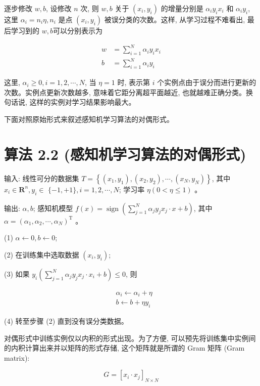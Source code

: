 \documentclass[10pt]{article}
\begin{document}
逐步修改 $w, b$, 设修改 $n$ 次, 则 $w, b$ 关于 $\left(x_{i}, y_{i}\right)$ 的增量分别是 $\alpha_{i} y_{i} x_{i}$ 和 $\alpha_{i} y_{i}$, 这里 $\alpha_{i}=n_{i} \eta, n_{i}$ 是点 $\left(x_{i}, y_{i}\right)$ 被误分类的次数。这样, 从学习过程不难看出, 最后学习到的 $w, b$可以分别表示为


\begin{align*}
w & =\sum_{i=1}^{N} \alpha_{i} y_{i} x_{i}  \tag{2.14}\\
b & =\sum_{i=1}^{N} \alpha_{i} y_{i} \tag{2.15}
\end{align*}


这里, $\alpha_{i} \geqslant 0, i=1,2, \cdots, N$, 当 $\eta=1$ 时, 表示第 $i$ 个实例点由于误分而进行更新的次数。实例点更新次数越多, 意味着它距分离超平面越近, 也就越难正确分类。换句话说, 这样的实例对学习结果影响最大。

下面对照原始形式来叙述感知机学习算法的对偶形式。

\section*{算法 2.2 (感知机学习算法的对偶形式)}
输入: 线性可分的数据集 $T=\left\{\left(x_{1}, y_{1}\right),\left(x_{2}, y_{2}\right), \cdots,\left(x_{N}, y_{N}\right)\right\}$, 其中 $x_{i} \in \boldsymbol{R}^{n}, y_{i} \in$ $\{-1,+1\}, i=1,2, \cdots, N$; 学习率 $\eta(0<\eta \leqslant 1)$ 。

输出: $\alpha, b$; 感知机模型 $f(x)=\operatorname{sign}\left(\sum_{j=1}^{N} \alpha_{j} y_{j} x_{j} \cdot x+b\right)$, 其中 $\alpha=\left(\alpha_{1}, \alpha_{2}, \cdots, \alpha_{N}\right)^{\mathrm{T}}$ 。

(1) $\alpha \leftarrow 0, b \leftarrow 0$;

(2) 在训练集中选取数据 $\left(x_{i}, y_{i}\right)$;

(3) 如果 $y_{i}\left(\sum_{j=1}^{N} \alpha_{j} y_{j} x_{j} \cdot x_{i}+b\right) \leqslant 0$, 则

$$
\begin{aligned}
& \alpha_{i} \leftarrow \alpha_{i}+\eta \\
& b \leftarrow b+\eta y_{i}
\end{aligned}
$$

(4) 转至步骤 (2) 直到没有误分类数据。

对偶形式中训练实例仅以内积的形式出现。为了方便, 可以预先将训练集中实例间的内积计算出来并以矩阵的形式存储, 这个矩阵就是所谓的 Gram 矩阵 (Gram matrix):

$$
G=\left[x_{i} \cdot x_{j}\right]_{N \times N}
$$
\end{document}

